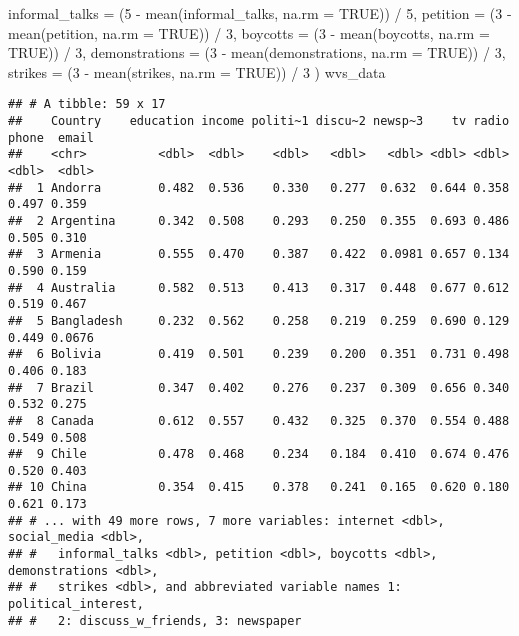 \documentclass[
]{article}
\newenvironment{Shaded}{\begin{snugshade}}{\end{snugshade}}
\newcommand{\AttributeTok}[1]{\textcolor[rgb]{0.77,0.63,0.00}{#1}}
\newcommand{\ConstantTok}[1]{\textcolor[rgb]{0.00,0.00,0.00}{#1}}
\newcommand{\DecValTok}[1]{\textcolor[rgb]{0.00,0.00,0.81}{#1}}
\newcommand{\FunctionTok}[1]{\textcolor[rgb]{0.00,0.00,0.00}{#1}}
\newcommand{\NormalTok}[1]{#1}
\newcommand{\SpecialCharTok}[1]{\textcolor[rgb]{0.00,0.00,0.00}{#1}}
\begin{document}
\begin{Shaded}
\begin{Highlighting}[]
         \AttributeTok{informal\_talks =}\NormalTok{ (}\DecValTok{5} \SpecialCharTok{{-}} \FunctionTok{mean}\NormalTok{(informal\_talks, }\AttributeTok{na.rm =} \ConstantTok{TRUE}\NormalTok{)) }\SpecialCharTok{/} \DecValTok{5}\NormalTok{,}
         \AttributeTok{petition =}\NormalTok{ (}\DecValTok{3} \SpecialCharTok{{-}} \FunctionTok{mean}\NormalTok{(petition, }\AttributeTok{na.rm =} \ConstantTok{TRUE}\NormalTok{)) }\SpecialCharTok{/} \DecValTok{3}\NormalTok{,}
         \AttributeTok{boycotts =}\NormalTok{ (}\DecValTok{3} \SpecialCharTok{{-}} \FunctionTok{mean}\NormalTok{(boycotts, }\AttributeTok{na.rm =} \ConstantTok{TRUE}\NormalTok{)) }\SpecialCharTok{/} \DecValTok{3}\NormalTok{,}
         \AttributeTok{demonstrations =}\NormalTok{ (}\DecValTok{3} \SpecialCharTok{{-}} \FunctionTok{mean}\NormalTok{(demonstrations, }\AttributeTok{na.rm =} \ConstantTok{TRUE}\NormalTok{)) }\SpecialCharTok{/} \DecValTok{3}\NormalTok{,}
         \AttributeTok{strikes =}\NormalTok{ (}\DecValTok{3} \SpecialCharTok{{-}} \FunctionTok{mean}\NormalTok{(strikes, }\AttributeTok{na.rm =} \ConstantTok{TRUE}\NormalTok{)) }\SpecialCharTok{/} \DecValTok{3}
\NormalTok{            )}
\NormalTok{wvs\_data}
\end{Highlighting}
\end{Shaded}

\begin{verbatim}
## # A tibble: 59 x 17
##    Country    education income politi~1 discu~2 newsp~3    tv radio phone  email
##    <chr>          <dbl>  <dbl>    <dbl>   <dbl>   <dbl> <dbl> <dbl> <dbl>  <dbl>
##  1 Andorra        0.482  0.536    0.330   0.277  0.632  0.644 0.358 0.497 0.359 
##  2 Argentina      0.342  0.508    0.293   0.250  0.355  0.693 0.486 0.505 0.310 
##  3 Armenia        0.555  0.470    0.387   0.422  0.0981 0.657 0.134 0.590 0.159 
##  4 Australia      0.582  0.513    0.413   0.317  0.448  0.677 0.612 0.519 0.467 
##  5 Bangladesh     0.232  0.562    0.258   0.219  0.259  0.690 0.129 0.449 0.0676
##  6 Bolivia        0.419  0.501    0.239   0.200  0.351  0.731 0.498 0.406 0.183 
##  7 Brazil         0.347  0.402    0.276   0.237  0.309  0.656 0.340 0.532 0.275 
##  8 Canada         0.612  0.557    0.432   0.325  0.370  0.554 0.488 0.549 0.508 
##  9 Chile          0.478  0.468    0.234   0.184  0.410  0.674 0.476 0.520 0.403 
## 10 China          0.354  0.415    0.378   0.241  0.165  0.620 0.180 0.621 0.173 
## # ... with 49 more rows, 7 more variables: internet <dbl>, social_media <dbl>,
## #   informal_talks <dbl>, petition <dbl>, boycotts <dbl>, demonstrations <dbl>,
## #   strikes <dbl>, and abbreviated variable names 1: political_interest,
## #   2: discuss_w_friends, 3: newspaper
\end{verbatim}
\end{document}
